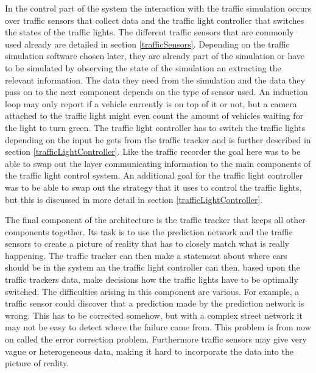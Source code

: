 In the control part of the system the interaction with the traffic simulation occurs over traffic sensors that collect data and the traffic light controller that switches the states of the traffic lights. The different traffic sensors that are commonly used already are detailed in section \ref{trafficSensors}. Depending on the traffic simulation software chosen later, they are already part of the simulation or have to be simulated by observing the state of the simulation an extracting the relevant information. The data they need from the simulation and the data they pass on to the next component depends on the type of sensor used. An induction loop may only report if a vehicle currently is on top of it or not, but a camera attached to the traffic light might even count the amount of vehicles waiting for the light to turn green. The traffic light controller has to switch the traffic lights depending on the input he gets from the traffic tracker and is further described in section \ref{trafficLightController}. Like the traffic recorder the goal here was to be able to swap out the layer communicating information to the main components of the traffic light control system. An additional goal for the traffic light controller was to be able to swap out the strategy that it uses to control the traffic lights, but this is discussed in more detail in section \ref{trafficLightController}.

The final component of the architecture is the traffic tracker that keeps all other components together. Its task is to use the prediction network and the traffic sensors to create a picture of reality that has to closely match what is really happening. The traffic tracker can then make a statement about where cars should be in the system an the traffic light controller can then, based upon the traffic trackers data, make decisions how the traffic lights have to be optimally switched. The difficulties arising in this component are various. For example, a traffic sensor could discover that a  prediction made by the prediction network is wrong. This has to be corrected somehow, but with a complex street network it may not be easy to detect where the failure came from. This problem is from now on called the error correction problem. Furthermore traffic sensors may give very vague or heterogeneous data, making it hard to incorporate the data into the picture of reality.


